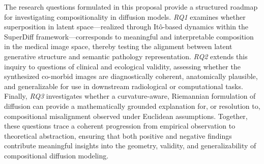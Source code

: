The research questions formulated in this proposal provide a structured roadmap for investigating compositionality in diffusion models.  
\emph{RQ1} examines whether superposition in latent space—realized through Itô-based dynamics within the SuperDiff framework—corresponds to meaningful and interpretable composition in the medical image space, thereby testing the alignment between latent generative structure and semantic pathology representation.  
\emph{RQ2} extends this inquiry to questions of clinical and ecological validity, assessing whether the synthesized co-morbid images are diagnostically coherent, anatomically plausible, and generalizable for use in downstream radiological or computational tasks.  
Finally, \emph{RQ3} investigates whether a curvature-aware, Riemannian formulation of diffusion can provide a mathematically grounded explanation for, or resolution to, compositional misalignment observed under Euclidean assumptions.  
Together, these questions trace a coherent progression from empirical observation to theoretical abstraction, ensuring that both positive and negative findings contribute meaningful insights into the geometry, validity, and generalizability of compositional diffusion modeling.




